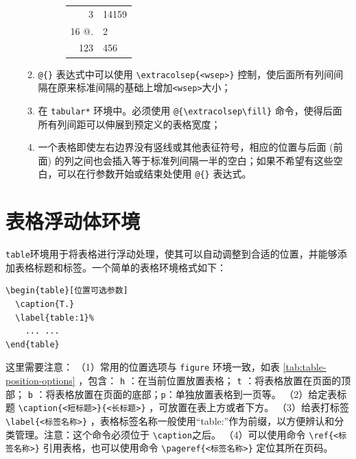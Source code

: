 \begin{enumerate}
\begin{enumerate}
\begin{figure}[!hpbt]
\begin{minipage}{0.5\textwidth}
        \end{minipage}
        \begin{minipage}{0.45\textwidth}
        \centering
        \begin{tabular}{rl}
        3   & 14159 \\
        16  @{.\hspace{\fill}}& 2     \\
        123 & 456   \\
        \end{tabular}
        \end{minipage}
        \end{figure}
        \item \verb|@{}| 表达式中可以使用 \verb|\extracolsep{<wsep>}| 控制，使后面所有列间间隔在原来标准间隔的基础上增加\verb|<wsep>|大小；
        \item 在 \verb|tabular*| 环境中。必须使用 \verb|@{\extracolsep\fill}| 命令，使得后面所有列间距可以伸展到预定义的表格宽度；
        \item 一个表格即使左右边界没有竖线或其他表征符号，相应的位置与后面 (前面) 的列之间也会插入等于标准列间隔一半的空白；如果不希望有这些空白，可以在行参数开始或结束处使用 \verb|@{}| 表达式。
    \end{enumerate}
\end{enumerate}


\section{表格浮动体环境}
\texttt{table}环境用于将表格进行浮动处理，使其可以自动调整到合适的位置，并能够添加表格标题和标签。一个简单的表格环境格式如下：
\begin{verbatim}
\begin{table}[位置可选参数]
  \caption{T.}
  \label{table:1}%
    ... ...
\end{table}
\end{verbatim}
这里需要注意：
（1）常用的位置选项与 \verb|figure| 环境一致，如表 \ref{tab:table-position-options} ，包含： \verb|h| ：在当前位置放置表格； \verb|t| ：将表格放置在页面的顶部； \verb|b| ：将表格放置在页面的底部；\verb|p|：单独放置表格到一页等。
（2）给定表标题 \verb|\caption{<短标题>}{<长标题>}| ，可放置在表上方或者下方。
（3）给表打标签 \verb|\label{<标签名称>}| ，表格标签名称一般使用“table:”作为前缀，以方便辨认和分类管理。注意：这个命令必须位于 \verb|\caption|之后。
（4）可以使用命令  \verb|\ref{<标签名称>}| 引用表格，也可以使用命令 \verb|\pageref{<标签名称>}| 定位其所在页码。


